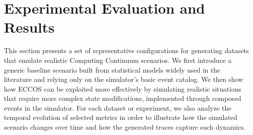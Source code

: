 \documentclass[ASNA]{USG} %
\begin{document}
\section{Experimental Evaluation and Results}
\label{sect_experimentalevaluationandresults}

This section presents a set of representative configurations for generating datasets that emulate realistic Computing Continuum scenarios. We first introduce a generic baseline scenario built from statistical models widely used in the literature and relying only on the simulator's basic event catalog. We then show how \textsc{ECCOS} can be exploited more effectively by simulating realistic situations that require more complex state modifications, implemented through composed events in the simulator. For each dataset or experiment, we also analyze the temporal evolution of selected metrics in order to illustrate how the simulated scenario changes over time and how the generated traces capture such dynamics.
\end{document}
